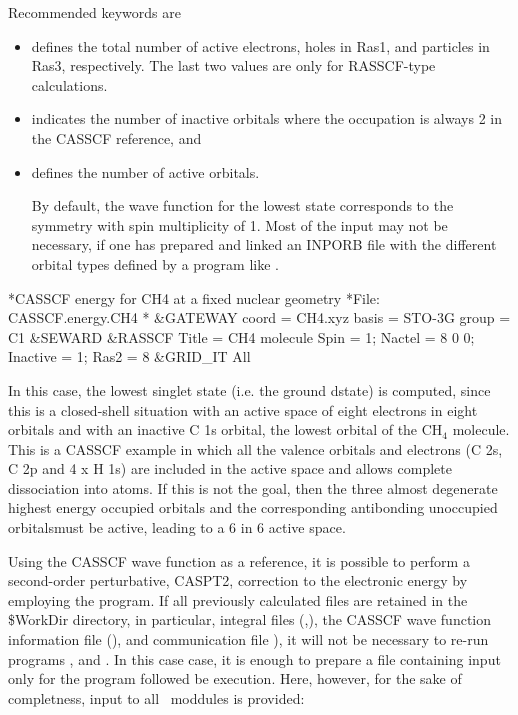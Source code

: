 Recommended keywords are 
\begin{itemize}
\item {} defines the total number of active 
electrons, holes in Ras1, and particles in Ras3, respectively.  The last two values 
are only for RASSCF-type calculations. 
\item {} indicates the number of inactive orbitals where the occupation is always 2 in the CASSCF reference, and 
\item {} defines the number of active orbitals. 

By default, the wave function for the lowest state corresponds to the symmetry with spin multiplicity of 1.
Most of the input may not be necessary, if one has prepared and linked an INPORB file with the different orbital types defined by 
a program like .
\end{itemize}

\begin{inputlisting}
*CASSCF energy for CH4 at a fixed nuclear geometry
*File: CASSCF.energy.CH4
*
&GATEWAY
 coord = CH4.xyz
 basis = STO-3G
 group = C1
&SEWARD
&RASSCF
 Title = CH4 molecule
 Spin = 1; Nactel = 8 0 0; Inactive = 1; Ras2 = 8
&GRID_IT
 All
\end{inputlisting}

In this case, the lowest singlet state (i.e. the ground dstate) is computed, since this is a 
closed-shell situation with an active space of eight electrons in eight orbitals and 
with an inactive C 1s orbital, the lowest orbital of the CH$_4$ molecule. This is a CASSCF example in which all the valence 
orbitals and electrons (C 2s, C 2p and 4 x H 1s) are included 
in the active space and allows complete dissociation into
atoms. If this is not the goal, then the three almost degenerate 
highest energy occupied orbitals and the corresponding antibonding unoccupied orbitalsmust be active, leading to 
a 6 in 6 active space.

Using the CASSCF wave function as a reference, it is possible to perform a second-order 
perturbative, CASPT2, correction to the electronic energy by employing the 
 program. If all previously calculated files are retained in the 
\$WorkDir directory, in particular, integral files (,), 
the CASSCF wave function information file (), and communication file ), it will not be 
necessary to re-run programs , and . In this case
case, it is enough to prepare a file containing input only for the  program followed be execution.
Here, however, for the sake of completness, input to all \molcas\ moddules is provided:

